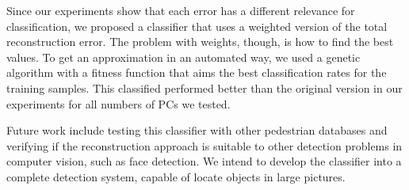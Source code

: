 \documentclass[10pt, conference, compsocconf]{IEEEtran}
\begin{document}
Since our experiments show that each error has a different relevance for classification, we proposed a classifier that uses a weighted version of the total reconstruction error. The problem with weights, though, is how to find the best values. To get an approximation in an automated way, we used a genetic algorithm with a fitness function that aims the best classification rates for the training samples. This classified performed better than the original version in our experiments for all numbers of PCs we tested. %

Future work include testing this classifier with other pedestrian databases and verifying if the reconstruction approach is suitable to other detection problems in computer vision, such as face detection. We intend to develop the classifier into a complete detection system, capable of locate objects in large pictures.%





% 
% 






%






\end{document}

